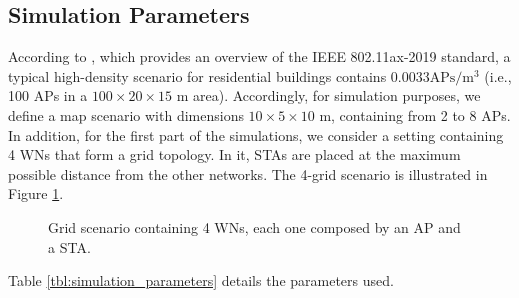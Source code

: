 \documentclass[10pt,journal,compsoc]{IEEEtran}
\begin{document}
	\subsection{Simulation Parameters}
	\label{section:simulation_parameters}
	According to \cite{bellalta2016ax}, which provides an overview of the IEEE 802.11ax-2019 standard, a typical high-density scenario for residential buildings contains $0.0033 \text{APs}/\text{m}^3$ (i.e., 100 APs in a $100 \times 20 \times 15$ m area). Accordingly, for simulation purposes, we define a map scenario with dimensions $10\times5\times10$ m, containing from 2 to 8 APs. In addition, for the first part of the simulations, we consider a setting containing 4 WNs that form a grid topology. In it, STAs are placed at the maximum possible distance from the other networks. The 4-grid scenario is illustrated in Figure \ref{fig:scenario}.
	\begin{figure}[t!]
		\centering											
		\caption{Grid scenario containing 4 WNs, each one composed by an AP and a STA.}
		\label{fig:scenario}
	\end{figure}
	Table \ref{tbl:simulation_parameters} details the parameters used.	
\end{document}
